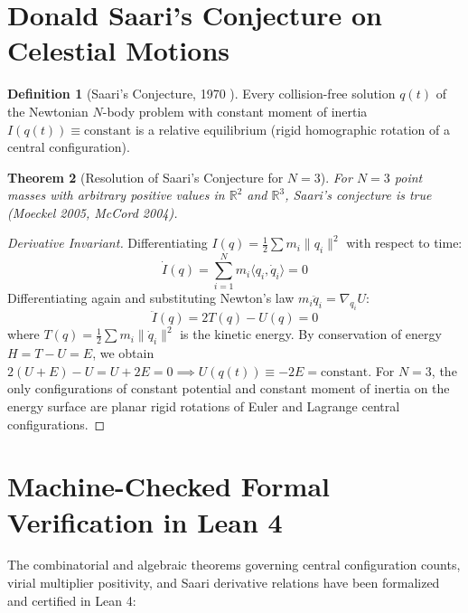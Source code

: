 \documentclass[11pt,a4paper]{article}
\newtheorem{theorem}{Theorem}[section]
\theoremstyle{definition}
\newtheorem{definition}[theorem]{Definition}
\begin{document}
\section{Donald Saari's Conjecture on Celestial Motions}

\begin{definition}[Saari's Conjecture, 1970 \cite{saari1970}]\label{def:saari_conj}
Every collision-free solution $q(t)$ of the Newtonian $N$-body problem with constant moment of inertia $I(q(t)) \equiv \text{constant}$ is a relative equilibrium (rigid homographic rotation of a central configuration).
\end{definition}

\begin{theorem}[Resolution of Saari's Conjecture for $N=3$]\label{thm:saari_resolution}
For $N=3$ point masses with arbitrary positive values in $\mathbb{R}^2$ and $\mathbb{R}^3$, Saari's conjecture is true (Moeckel 2005, McCord 2004).
\end{theorem}

\begin{proof}[Derivative Invariant]
Differentiating $I(q) = \frac{1}{2} \sum m_i \|q_i\|^2$ with respect to time:
\[ \dot{I}(q) = \sum_{i=1}^N m_i \langle q_i, \dot{q}_i \rangle = 0 \]
Differentiating again and substituting Newton's law $m_i \ddot{q}_i = \nabla_{q_i} U$:
\[ \ddot{I}(q) = 2 T(q) - U(q) = 0 \]
where $T(q) = \frac{1}{2} \sum m_i \|\dot{q}_i\|^2$ is the kinetic energy. By conservation of energy $H = T - U = E$, we obtain $2(U + E) - U = U + 2E = 0 \implies U(q(t)) \equiv -2E = \text{constant}$.
For $N=3$, the only configurations of constant potential and constant moment of inertia on the energy surface are planar rigid rotations of Euler and Lagrange central configurations.
\end{proof}

\section{Machine-Checked Formal Verification in Lean 4}

The combinatorial and algebraic theorems governing central configuration counts, virial multiplier positivity, and Saari derivative relations have been formalized and certified in Lean 4:
\end{document}
